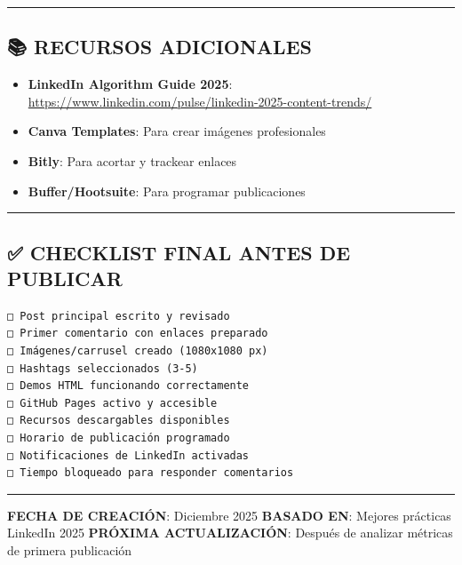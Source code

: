 \documentclass[
]{article}
\providecommand{\tightlist}{%
  \setlength{\itemsep}{0pt}\setlength{\parskip}{0pt}}
\begin{document}
\begin{center}\rule{0.5\linewidth}{0.5pt}\end{center}

\subsection{📚 RECURSOS ADICIONALES}\label{recursos-adicionales}

\begin{itemize}
\tightlist
\item
  \textbf{LinkedIn Algorithm Guide 2025}:
  \url{https://www.linkedin.com/pulse/linkedin-2025-content-trends/}
\item
  \textbf{Canva Templates}: Para crear imágenes profesionales
\item
  \textbf{Bitly}: Para acortar y trackear enlaces
\item
  \textbf{Buffer/Hootsuite}: Para programar publicaciones
\end{itemize}

\begin{center}\rule{0.5\linewidth}{0.5pt}\end{center}

\subsection{✅ CHECKLIST FINAL ANTES DE
PUBLICAR}\label{checklist-final-antes-de-publicar}

\begin{verbatim}
□ Post principal escrito y revisado
□ Primer comentario con enlaces preparado
□ Imágenes/carrusel creado (1080x1080 px)
□ Hashtags seleccionados (3-5)
□ Demos HTML funcionando correctamente
□ GitHub Pages activo y accesible
□ Recursos descargables disponibles
□ Horario de publicación programado
□ Notificaciones de LinkedIn activadas
□ Tiempo bloqueado para responder comentarios
\end{verbatim}

\begin{center}\rule{0.5\linewidth}{0.5pt}\end{center}

\textbf{FECHA DE CREACIÓN}: Diciembre 2025 \textbf{BASADO EN}: Mejores
prácticas LinkedIn 2025 \textbf{PRÓXIMA ACTUALIZACIÓN}: Después de
analizar métricas de primera publicación
\end{document}
